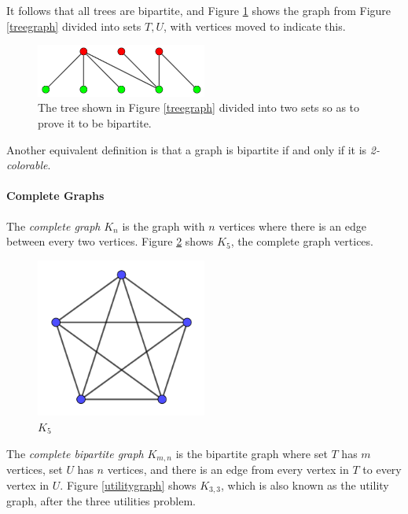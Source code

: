 \documentclass[11pt,a4paper]{report}
\begin{document}
\begin{adjustwidth}{5cm}{5cm}
It follows that all trees are bipartite, and Figure \ref{bipartitetree} shows the graph from Figure \ref{treegraph} divided into sets \(T,U\), with vertices moved to indicate this.

\begin{figure}[h]
	\centering
	\includegraphics[width=0.5\textwidth]{bipartitetree}
	\caption{The tree shown in Figure \ref{treegraph} divided into two sets so as to prove it to be bipartite.}
	\label{bipartitetree}
\end{figure}

Another equivalent definition is that a graph is bipartite if and only if it is \textit{2-colorable}\footnotemark[\ref{definedlater}].

\paragraph{Complete Graphs}

The \textit{complete graph} \(K_n\) is the graph with \(n\) vertices where there is an edge between every two vertices. Figure \ref{k5graph} shows \(K_5\), the complete graph vertices.

\begin{figure}[h]
	\centering
	\includegraphics[width=0.5\textwidth]{k5graph}
	\caption{\(K_5\)}
	\label{k5graph}
\end{figure}

The \textit{complete bipartite graph} \(K_{m,n}\) is the bipartite graph where set \(T\) has \(m\) vertices, set \(U\) has \(n\) vertices, and there is an edge from every vertex in \(T\) to every vertex in \(U\). Figure \ref{utilitygraph} shows \(K_{3,3}\), which is also known as the utility graph, after the three utilities problem.


\end{adjustwidth}
\end{document}

